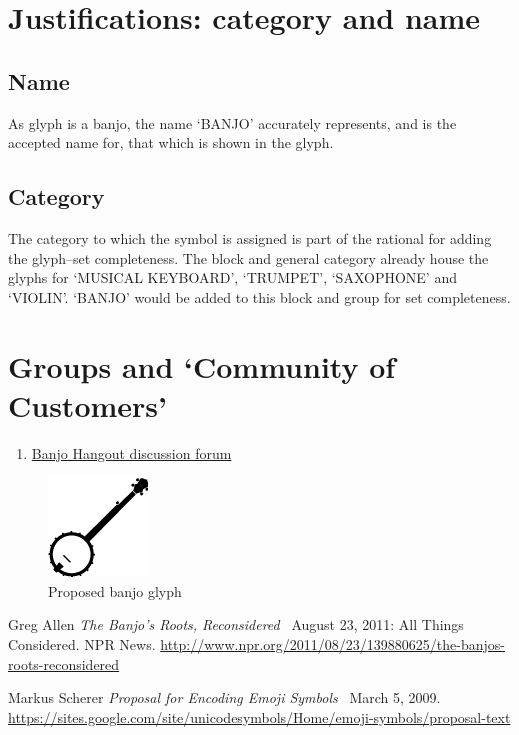 \documentclass[12pt]{article}
\begin{document}
  \section{Justifications: category and name}
    \subsection{Name}
    As glyph is a banjo, the name `BANJO' accurately represents, and is 
    the accepted name for, that which is shown in the glyph.

    \subsection{Category}
    The category to which the symbol is assigned is part of the rational for
    adding the glyph--set completeness. The block and general category already
    house the glyphs for `MUSICAL KEYBOARD', `TRUMPET', `SAXOPHONE' and `VIOLIN'. 
    `BANJO' would be added to this block and group for set completeness.

  \section{Groups and `Community of Customers'}
    \begin{enumerate}
      \item \href{http://www.banjohangout.org/topic/278863}{Banjo Hangout discussion forum}
    \end{enumerate}

  \begin{figure}[p]
    \centering
    \includegraphics{banjo}
    \caption{Proposed banjo glyph}
    \label{fig:banjo_glyph}
  \end{figure}

  \begin{thebibliography}{1}
     Greg Allen {\em The Banjo's Roots, Reconsidered } \ August 23, 2011: All Things Considered. NPR News. \url{http://www.npr.org/2011/08/23/139880625/the-banjos-roots-reconsidered}

     Markus Scherer {\em Proposal for Encoding Emoji Symbols } \ March 5, 2009. \url{https://sites.google.com/site/unicodesymbols/Home/emoji-symbols/proposal-text}
  \end{thebibliography}
\end{document}
